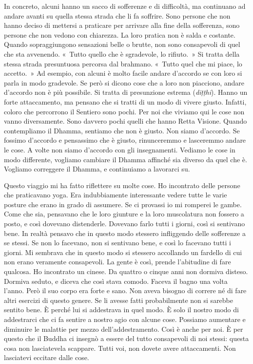 In concreto, alcuni hanno un sacco di sofferenze e di difficoltà, ma
continuano ad andare avanti su quella stessa strada che li fa soffrire.
Sono persone che non hanno deciso di mettersi a praticare per arrivare
alla fine della sofferenza, sono persone che non vedono con chiarezza.
La loro pratica non è salda e costante. Quando sopraggiungono sensazioni
belle o brutte, non sono consapevoli di quel che sta avvenendo. «~Tutto
quello che è sgradevole, lo rifiuto.~» Si tratta della stessa strada
presuntuosa percorsa dal brahmano. «~Tutto quel che mi piace, lo
accetto.~» Ad esempio, con alcuni è molto facile andare d'accordo se con
loro si parla in modo gradevole. Se però si dicono cose che a loro non
piacciono, andare d'accordo non è più possibile. Si tratta di
presunzione estrema (\emph{diṭṭhi}). Hanno un forte attaccamento, ma
pensano che si tratti di un modo di vivere giusto. Infatti, coloro che
percorrono il Sentiero sono pochi. Per noi che viviamo qui le cose non
vanno diversamente. Sono davvero pochi quelli che hanno Retta Visione.
Quando contempliamo il Dhamma, sentiamo che non è giusto. Non siamo
d'accordo. Se fossimo d'accordo e pensassimo che è giusto, rinunceremmo
e lasceremmo andare le cose. A volte non siamo d'accordo con gli
insegnamenti. Vediamo le cose in modo differente, vogliamo cambiare il
Dhamma affinché sia diverso da quel che è. Vogliamo correggere il
Dhamma, e continuiamo a lavorarci su.

Questo viaggio mi ha fatto riflettere su molte cose. Ho incontrato delle
persone che praticavano yoga. Era indubbiamente interessante vedere
tutte le varie posture che erano in grado di assumere. Se ci provassi io
mi romperei le gambe. Come che sia, pensavano che le loro giunture e la
loro muscolatura non fossero a posto, e così dovevano distenderle.
Dovevano farlo tutti i giorni, così si sentivano bene. In realtà pensavo
che in questo modo stessero infliggendo delle sofferenze a se stessi. Se
non lo facevano, non si sentivano bene, e così lo facevano tutti i
giorni. Mi sembrava che in questo modo si stessero accollando un
fardello di cui non erano veramente consapevoli. La gente è così, prende
l'abitudine di fare qualcosa. Ho incontrato un cinese. Da quattro o
cinque anni non dormiva disteso. Dormiva seduto, e diceva che così stava
comodo. Faceva il bagno una volta l'anno. Però il suo corpo era forte e
sano. Non aveva bisogno di correre né di fare altri esercizi di questo
genere. Se li avesse fatti probabilmente non si sarebbe sentito bene. È
perché lui si addestrava in quel modo. È solo il nostro modo di
addestrarci che ci fa sentire a nostro agio con alcune cose. Possiamo
aumentare e diminuire le malattie per mezzo dell'addestramento. Così è
anche per noi. È per questo che il Buddha ci insegnò a essere del tutto
consapevoli di noi stessi: questa cosa non lasciatevela scappare. Tutti
voi, non dovete avere attaccamenti. Non lasciatevi eccitare dalle cose.

